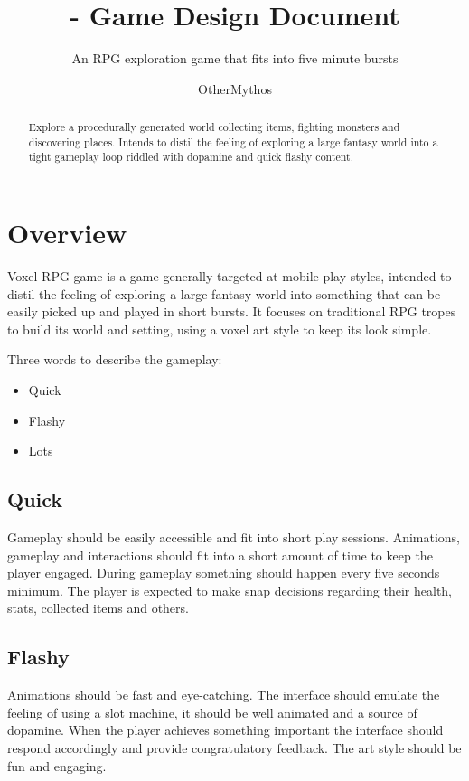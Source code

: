 \documentclass[a4paper]{scrreprt}
\title{\nameofgame{} - Game Design Document}
\subtitle{An RPG exploration game that fits into five minute bursts}
\author{OtherMythos}
\date{\parbox{\linewidth}{\centering%
  \color{red}
  V0.1.0 - Work in progress\endgraf
  
  }}
\newcommand{\nameofgame}{Voxel RPG game}
\begin{document}
\maketitle
\newpage

\begin{abstract}
Explore a procedurally generated world collecting items, fighting monsters and discovering places.
Intends to distil the feeling of exploring a large fantasy world into a tight gameplay loop riddled with dopamine and quick flashy content.
\end{abstract}

\tableofcontents

\chapter{Overview}


\nameofgame{} is a game generally targeted at mobile play styles, intended to distil the feeling of exploring a large fantasy world into something that can be easily picked up and played in short bursts.
It focuses on traditional RPG tropes to build its world and setting, using a voxel art style to keep its look simple.

\vspace{5mm}
Three words to describe the gameplay:

\begin{itemize}
    \item Quick
    \item Flashy
    \item Lots
\end{itemize}

\section{Quick}
Gameplay should be easily accessible and fit into short play sessions.
Animations, gameplay and interactions should fit into a short amount of time to keep the player engaged.
During gameplay something should happen every five seconds minimum.
The player is expected to make snap decisions regarding their health, stats, collected items and others.

\section{Flashy}
Animations should be fast and eye-catching.
The interface should emulate the feeling of using a slot machine, it should be well animated and a source of dopamine.
When the player achieves something important the interface should respond accordingly and provide congratulatory feedback.
The art style should be fun and engaging.
\end{document}
